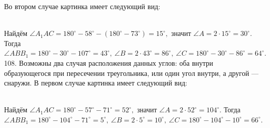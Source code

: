 \documentclass[12pt]{article}
\begin{document}
Во втором случае картинка имеет следующий вид:
\begin{figure}[ht!]
\end{figure}\\
Найдём $\angle A_1AC=180^\circ-58^\circ-(180^\circ-73^\circ)=15^\circ,$ значит $\angle A=2\cdot15^\circ=30^\circ.$ Тогда $\angle ABB_1=180^\circ-30^\circ-107^\circ=43^\circ,\ \angle B=2\cdot43^\circ=86^\circ,\ \angle C=180^\circ-30^\circ-86^\circ=64^\circ.$\\
108. Возможны два случая расположения данных углов: оба внутри образующегося при пересечении треугольника, или один угол внутри, а другой --- снаружи. В первом случае картинка имеет следующий вид:
\begin{figure}[ht!]
\end{figure}\\
Найдём $\angle A_1AC=180^\circ-57^\circ-71^\circ=52^\circ,$ значит $\angle A=2\cdot52^\circ=104^\circ.$ Тогда $\angle ABB_1=180^\circ-104^\circ-71^\circ=5^\circ,\ \angle B=2\cdot5^\circ=10^\circ,\ \angle C=180^\circ-104^\circ-10^\circ=66^\circ.$\\
\end{document}
